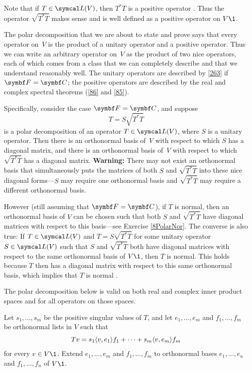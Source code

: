 Note that if $T \in \L(V)$, then $T^* T$ is a positive operator . Thus the operator $\sqrt{T^*T}$ makes sense and is well defined as a positive operator on $V\1$.

The polar decomposition that we are about to state and prove says that every operator on~$V$ is the
product of a unitary operator and a positive operator.  Thus we can write an arbitrary
operator on~$V$ as the product of two nice operators, each of which comes from a
class that we can completely describe and that we understand reasonably
well. The unitary operators are described by \ref{263} if $\F{} = \C{}$; the positive
operators are described by the real and complex spectral theorems (\ref{86} and \ref{85}).

Specifically, consider the case $\F{} = \C{}$, and suppose
\[
T = S \sqrt{T^* T}
\]
is a polar decomposition of an operator $T \in \L(V)$, where $S$ is a unitary operator.  Then there is an orthonormal basis of~$V$ with respect to which $S$ has a diagonal matrix, and there is an orthonormal basis of~$V$ with respect to which $\sqrt{T^* T}$ has a diagonal matrix. \textbf{Warning:} There may not exist an orthonormal basis that simultaneously puts the matrices of both $S$ and
$\sqrt{T^* T}$ into these nice diagonal forms---$S$ may require one orthonormal basis and $\sqrt{T^* T}$ may require a different orthonormal basis.

However (still assuming that $\F{} = \C{}$), if $T$ is normal, then an orthonormal basis of $V$ can be chosen such that both $S$ and $\sqrt{T^*T}$ have diagonal matrices with respect to this basis---see Exercise \ref{8PolarNor}. The converse is also true: If $T \in \L(V)$ and $T = S \sqrt{T^*T}$ for some unitary operator $S \in \L(V)$ such that $S$ and $\sqrt{T^*T}$ both have diagonal matrices with respect to the same orthonormal basis of $V\1$, then $T$ is normal. This holds because $T$ then has a diagonal matrix with respect to this same orthonormal basis, which implies that $T$ is normal .

The polar decomposition below is valid on both real and complex inner product spaces and for all operators on those spaces.


\proof
Let $s_1, \ldots, s_m$ be the positive singular values of $T$, and let $e_1, \ldots, e_m$ and $f_1, \dots, f_m$ be orthonormal lists in $V$ such that
\begin{equation} \label{4polar}
Tv = s_1 \langle v, e_1\rangle f_1 + \cdots + s_m \langle v, e_m\rangle f_m
\end{equation}%
for every $v \in V\1$. Extend $e_1, \ldots, e_m$ and $f_1, \dots, f_m$ to orthonormal bases $e_1, \ldots, e_n$ and $f_1, \dots, f_n$ of $V\1$.

